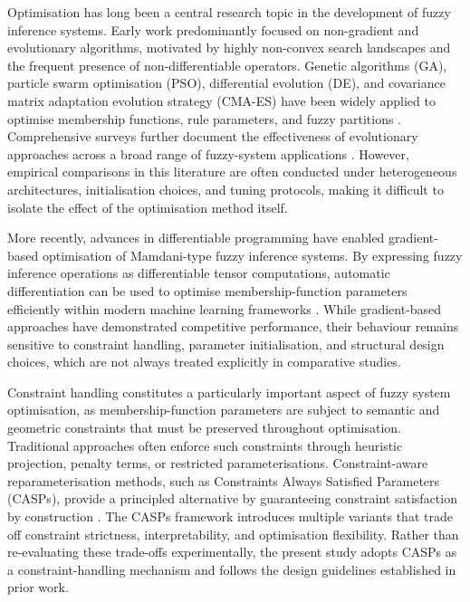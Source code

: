 \documentclass[conference]{IEEEtran}
\begin{document}
Optimisation has long been a central research topic in the development of
fuzzy inference systems.
Early work predominantly focused on non-gradient and evolutionary algorithms,
motivated by highly non-convex search landscapes and the frequent presence of
non-differentiable operators.
Genetic algorithms (GA), particle swarm optimisation (PSO), differential
evolution (DE), and covariance matrix adaptation evolution strategy (CMA-ES)
have been widely applied to optimise membership functions, rule parameters,
and fuzzy partitions
\cite{holland1975ga, kennedy1995pso, storn1997de, hansen2001cmaes}.
Comprehensive surveys further document the effectiveness of evolutionary
approaches across a broad range of fuzzy-system applications
\cite{cordon2001review}.
However, empirical comparisons in this literature are often conducted under
heterogeneous architectures, initialisation choices, and tuning protocols,
making it difficult to isolate the effect of the optimisation method itself.

More recently, advances in differentiable programming have enabled
gradient-based optimisation of Mamdani-type fuzzy inference systems.
By expressing fuzzy inference operations as differentiable tensor computations,
automatic differentiation can be used to optimise membership-function
parameters efficiently within modern machine learning frameworks
\cite{chen2024gradient}.
While gradient-based approaches have demonstrated competitive performance,
their behaviour remains sensitive to constraint handling, parameter
initialisation, and structural design choices, which are not always treated
explicitly in comparative studies.

Constraint handling constitutes a particularly important aspect of fuzzy
system optimisation, as membership-function parameters are subject to semantic
and geometric constraints that must be preserved throughout optimisation.
Traditional approaches often enforce such constraints through heuristic
projection, penalty terms, or restricted parameterisations.
Constraint-aware reparameterisation methods, such as Constraints Always
Satisfied Parameters (CASPs), provide a principled alternative by guaranteeing
constraint satisfaction by construction
\cite{chen2025casp}.
The CASPs framework introduces multiple variants that trade off constraint
strictness, interpretability, and optimisation flexibility.
Rather than re-evaluating these trade-offs experimentally, the present study
adopts CASPs as a constraint-handling mechanism and follows the design
guidelines established in prior work.
\end{document}
